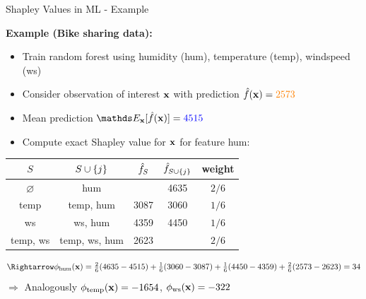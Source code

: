 \documentclass[10pt,compress,t,notes=noshow, xcolor=table]{beamer}
\begin{document}
\begin{frame}{Shapley Values in ML - Example}
  
  \textbf{Example (Bike sharing data):}

  \begin{itemize}
  \item Train random forest using humidity (hum), temperature (temp), windspeed (ws)
      \item Consider observation of interest $\mathbf{x}$ with prediction $\hat{f}(\mathbf{x}) = \color{orange}{2573}$
      \item Mean prediction $\E_{\xv}[\fh(\xv)] = \color{blue}{4515}$
      \item Compute exact Shapley value for $\mathbf{x}$ for feature hum:
  \end{itemize}
  
      \begin{center}
      \begin{tabular}{c|c|c|c|c}
   $S$    &  $S \cup \{j\}$  & $\hat{f}_S$ &  $\hat{f}_{S \cup \{j\}}$  & weight\\\hline
     $\varnothing$&    hum  & \color{blue}{4515} & 4635 & $2/6$\\
       temp &  temp, hum & 3087 & 3060& $1/6$\\
       ws &  ws, hum & 4359  & 4450 & $1/6$\\
       temp, ws & temp, ws, hum & 2623 & \color{orange}{2573} & $2/6$
      \end{tabular}
      \end{center}
$$\Rightarrow
\phi_{\text{hum}}(\xv) = \tfrac{2}{6} (4635-4515) + \tfrac{1}{6} (3060-3087) + \tfrac{1}{6} (4450-4359) + \tfrac{2}{6} (2573-2623) = 34
$$
$\Rightarrow$ Analogously $\phi_{\text{temp}}(\mathbf{x}) = -1654$, $\phi_{\text{ws}}(\mathbf{x}) = -322$

\end{frame}
\end{document}
